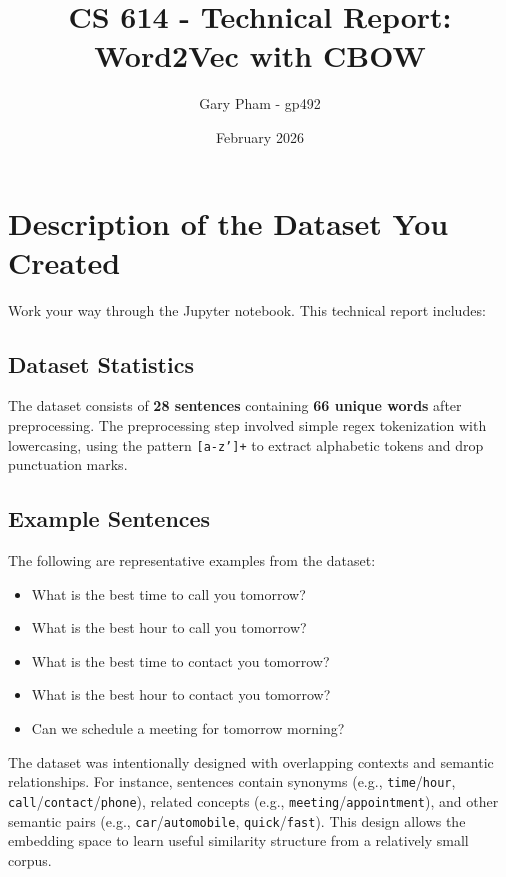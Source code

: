 \documentclass[11pt]{article}
\title{CS 614 - Technical Report: Word2Vec with CBOW}
\author{Gary Pham - gp492}
\date{February 2026}
\begin{document}
\maketitle

\section{Description of the Dataset You Created}

Work your way through the Jupyter notebook. This technical report includes:

\subsection{Dataset Statistics}

The dataset consists of \textbf{28 sentences} containing \textbf{66 unique words} after preprocessing. The preprocessing step involved simple regex tokenization with lowercasing, using the pattern \texttt{[a-z']+} to extract alphabetic tokens and drop punctuation marks.

\subsection{Example Sentences}

The following are representative examples from the dataset:

\begin{itemize}
  \item What is the best time to call you tomorrow?
  \item What is the best hour to call you tomorrow?
  \item What is the best time to contact you tomorrow?
  \item What is the best hour to contact you tomorrow?
  \item Can we schedule a meeting for tomorrow morning?
\end{itemize}

The dataset was intentionally designed with overlapping contexts and semantic relationships. For instance, sentences contain synonyms (e.g., \texttt{time}/\texttt{hour}, \texttt{call}/\texttt{contact}/\texttt{phone}), related concepts (e.g., \texttt{meeting}/\texttt{appointment}), and other semantic pairs (e.g., \texttt{car}/\texttt{automobile}, \texttt{quick}/\texttt{fast}). This design allows the embedding space to learn useful similarity structure from a relatively small corpus.
\end{document}
